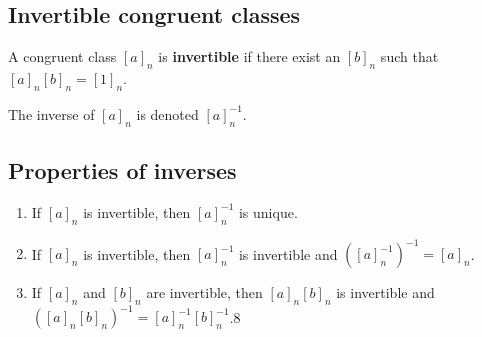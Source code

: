 \documentclass[a4paper]{article}
\begin{document}


\subsection{Invertible congruent classes}

A congruent class \({[a]}_n\) is \textbf{invertible}
if there exist an \({[b]}_n\) such that \({[a]}_n{[b]}_n={[1]}_n\).

The inverse of \({[a]}_n\) is denoted \({[a]}_n^{-1}\).

\subsection{Properties of inverses}

\begin{enumerate}
    \item If \({[a]}_n\) is invertible, then \({[a]}_n^{-1}\) is unique.
    \item If \({[a]}_n\) is invertible, then \({[a]}_n^{-1}\) is invertible and \(({[a]}_n^{-1})^{-1}={[a]}_n\).
    \item If \({[a]}_n\) and \({[b]}_n\) are invertible, then \({[a]}_n{[b]}_n\) is invertible and
    \({({[a]}_n{[b]}_n)}^{-1} = {[a]}_n^{-1}{[b]}_n^{-1}\).8
\end{enumerate}



\end{document}
